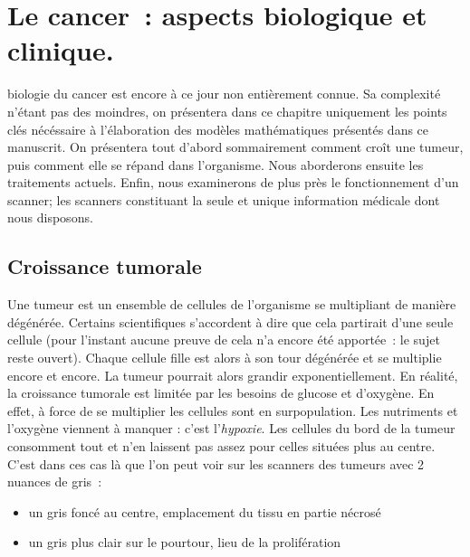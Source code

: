 \documentclass[main.tex]{subfiles}
\begin{document}
\chapter{Le cancer~: aspects biologique et clinique.}
 biologie du cancer est encore à ce jour non entièrement connue. Sa complexité n'étant pas des moindres, on présentera dans ce chapitre uniquement les points clés nécéssaire à l'élaboration des modèles mathématiques présentés dans ce manuscrit. On présentera tout d'abord sommairement comment croît une tumeur, puis comment elle se répand dans l'organisme. Nous aborderons ensuite les traitements actuels. Enfin, nous examinerons de plus près le fonctionnement d'un scanner; les scanners constituant la seule et unique information médicale dont nous disposons. 

\section{Croissance tumorale}
Une tumeur est un ensemble de cellules de l'organisme se multipliant de manière dégénérée. Certains scientifiques s'accordent à dire que cela partirait d'une seule cellule (pour l'instant aucune preuve de cela n'a encore été apportée~: le sujet reste ouvert). Chaque cellule fille est alors à son tour dégénérée et se multiplie encore et encore. La tumeur pourrait alors grandir exponentiellement. En réalité, la croissance tumorale est limitée par les besoins de glucose et d'oxygène. En effet, à force de se multiplier les cellules sont en surpopulation. Les nutriments et l'oxygène viennent à manquer : c'est l'\emph{hypoxie}. Les cellules du bord de la tumeur consomment tout et n'en laissent pas assez pour celles situées plus au centre. C'est dans ces cas là que l'on peut voir sur les scanners des tumeurs avec 2 nuances de gris~:
\begin{itemize}
\item un gris foncé au centre, emplacement du tissu en partie nécrosé
\item un gris plus clair sur le pourtour, lieu de la prolifération
\end{itemize}
\end{document}
